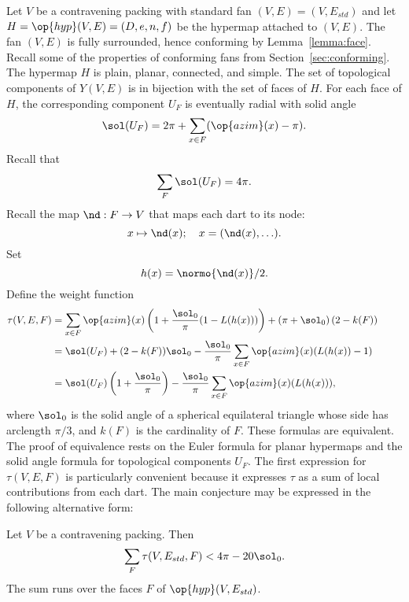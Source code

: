 Let $V$ be a contravening packing with
standard fan $(V,E)=(V,E_{std})$ and let   $H=\op{hyp}(V,E)=(D,e,n,f)$ 
be the hypermap attached to $(V,E)$.  The fan $(V,E)$ is fully surrounded, hence
conforming by Lemma~\ref{lemma:face}.  Recall some of the properties of conforming fans from
Section~\ref{sec:conforming}.
The hypermap $H$ is plain, planar, connected, and simple.
The set of topological components of $Y(V,E)$ is in bijection with
the set of faces of $H$.  
%
For each face of $H$, the corresponding component $U_F$
is eventually radial with solid
angle
%
\[ 
\sol(U_F) = 2\pi + \sum_{x\in F} (\op{azim}(x) -\pi).
\] 
Recall that
\[ \sum_{F} \sol(U_F) = 4\pi.\] 
Recall the map $\nd:F\to V$ that maps each dart to its node:
\[ 
x \mapsto \nd(x); \quad   x = (\nd(x),\ldots).
\] 
Set 
\[ h(x) = \normo{\nd(x)}/2.\] 
Define the weight function
\begin{align}
  \tau(V,E,F) &=\sum_{x\in F} \op{azim}(x)
  \left(1 + \dfrac{\sol_0}{\pi}(1- L(h(x)))\right) 
  + \left(\pi+{\sol_0}\right) (2- k(F))\qquad\phantom{t}\vspace{6pt}\nonumber\\
  &= \sol(U_F) + (2- k(F))\sol_0 - \dfrac{\sol_0}{\pi}
\sum_{x\in F}\op{azim}(x) (L(h(x)) - 1)\vspace{6pt}\nonumber\\
  &= \sol(U_F) \left( 1 + \dfrac{\sol_0}{\pi}\right) 
- \dfrac{\sol_0}{\pi} \sum_{x\in F} \op{azim}(x)(L(h(x))),\label{eqn:tau-sol}
\end{align}
where $\sol_0$ is the solid angle of a spherical equilateral triangle
whose side has arclength $\pi/3$, and $k(F)$ is the cardinality of $F$.
% 
These formulas are equivalent.  The proof of equivalence rests on the
Euler formula for planar hypermaps and the solid angle formula for
topological components $U_F$.  The first expression for $\tau(V,E,F)$
is particularly convenient because it expresses $\tau$ as a sum of
local contributions from each dart.  %
%
%
The main conjecture may be expressed in the following alternative
form:

\begin{lemma}[target]\label{lemma:4pi-sol}
Let $V$ be a contravening packing. %
Then
\[ 
\sum_F \tau (V,E_{std},F) < 4\pi - 20\sol_0.
\] 
The sum runs over the faces $F$ of $\op{hyp}(V,E_{std})$.
\end{lemma}

